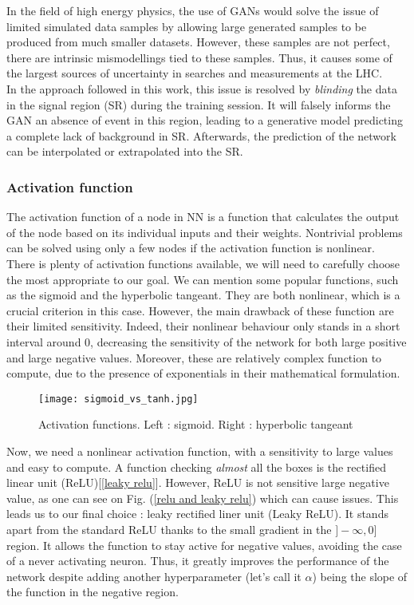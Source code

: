 \documentclass [12pt] {article}
\numberwithin{equation}{section} %
\numberwithin{figure}{section}   %
\begin{document}
In the field of high energy physics, the use of GANs would solve the issue of limited simulated data samples by allowing large generated samples to be produced from much smaller datasets. However, these samples are not perfect, there are intrinsic mismodellings tied to these samples. Thus, it causes some of the largest sources of uncertainty in searches and measurements at the LHC.\\
In the approach followed in this work, this issue is resolved by \textit{blinding} the data in the signal region (SR) during the training session. It will falsely informs the GAN an absence of event in this region, leading to a generative model predicting a complete lack of background in SR. Afterwards, the prediction of the network can be interpolated or extrapolated into the SR.

\subsubsection*{Activation function}

The activation function of a node in NN is a function that calculates the output of the node based on its individual inputs and their weights. Nontrivial problems can be solved using only a few nodes if the activation function is nonlinear.\\
There is plenty of activation functions available, we will need to carefully choose the most appropriate to our goal. We can mention some popular functions, such as the sigmoid and the hyperbolic tangeant. They are both nonlinear, which is a crucial criterion in this case. However, the main drawback of these function are their limited sensitivity. Indeed, their nonlinear behaviour only stands in a short interval around 0, decreasing the sensitivity of the network for both large positive and large negative values. Moreover, these are relatively complex function to compute, due to the presence of exponentials in their mathematical formulation.

\begin{figure}[H]
    \centering
    \texttt{[image: sigmoid\_vs\_tanh.jpg]}
    \caption{Activation functions. Left : sigmoid. Right : hyperbolic tangeant}
    \label{fig:enter-label}
\end{figure}

Now, we need a nonlinear activation function, with a sensitivity to large values and easy to compute. A function checking \textit{almost} all the boxes is the rectified linear unit (ReLU)[\ref{leaky relu}]. However, ReLU is not sensitive large negative value, as one can see on Fig. (\ref{relu and leaky relu}) which can cause issues. This leads us to our final choice : leaky rectified liner unit (Leaky ReLU). It stands apart from the standard ReLU thanks to the small gradient in the $]- \infty , 0]$ region. It allows the function to stay active for negative values, avoiding the case of a never activating neuron. Thus, it greatly improves the performance of the network despite adding another hyperparameter (let's call it $\alpha$) being the slope of the function in the negative region.\\
\end{document}
